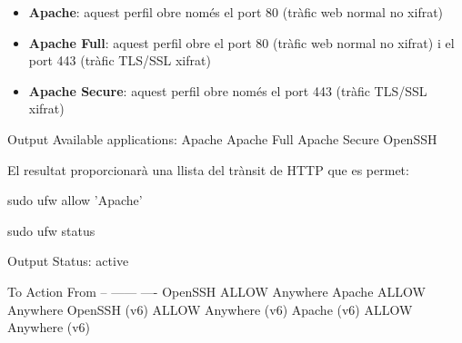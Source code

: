 \documentclass[]{article}
\newenvironment{Shaded}{}{}
\newcommand{\ExtensionTok}[1]{#1}
\newcommand{\FunctionTok}[1]{\textcolor[rgb]{0.02,0.16,0.49}{#1}}
\newcommand{\NormalTok}[1]{#1}
\newcommand{\StringTok}[1]{\textcolor[rgb]{0.25,0.44,0.63}{#1}}
\begin{document}
\begin{itemize}
\item
  \textbf{Apache}: aquest perfil obre només el port 80 (tràfic web
  normal no xifrat)
\item
  \textbf{Apache Full}: aquest perfil obre el port 80 (tràfic web normal
  no xifrat) i el port 443 (tràfic TLS/SSL xifrat)
\item
  \textbf{Apache Secure}: aquest perfil obre només el port 443 (tràfic
  TLS/SSL xifrat)
\end{itemize}

\begin{Shaded}
\begin{Highlighting}[]
\ExtensionTok{Output}
\ExtensionTok{Available}\NormalTok{ applications:}
  \ExtensionTok{Apache}
  \ExtensionTok{Apache}\NormalTok{ Full}
  \ExtensionTok{Apache}\NormalTok{ Secure}
  \ExtensionTok{OpenSSH}
\end{Highlighting}
\end{Shaded}

El resultat proporcionarà una llista del trànsit de HTTP que es permet:

\begin{Shaded}
\begin{Highlighting}[]
\FunctionTok{sudo}\NormalTok{ ufw allow }\StringTok{'Apache'}
\end{Highlighting}
\end{Shaded}

\begin{Shaded}
\begin{Highlighting}[]
\FunctionTok{sudo}\NormalTok{ ufw status}
\end{Highlighting}
\end{Shaded}

\begin{Shaded}
\begin{Highlighting}[]
\ExtensionTok{Output}
\ExtensionTok{Status}\NormalTok{: active}

\ExtensionTok{To}\NormalTok{                         Action      From}
\ExtensionTok{--}\NormalTok{                         ------      ----}
\ExtensionTok{OpenSSH}\NormalTok{                    ALLOW       Anywhere                  }
\ExtensionTok{Apache}\NormalTok{                     ALLOW       Anywhere                }
\ExtensionTok{OpenSSH}\NormalTok{ (v6)               }\ExtensionTok{ALLOW}\NormalTok{       Anywhere (v6)             }
\ExtensionTok{Apache}\NormalTok{ (v6)                }\ExtensionTok{ALLOW}\NormalTok{       Anywhere (v6)}
\end{Highlighting}
\end{Shaded}
\end{document}
